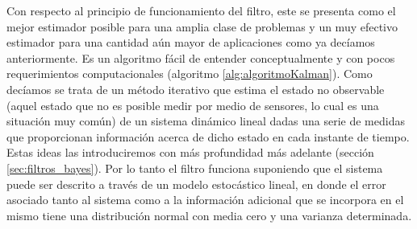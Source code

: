 %
%
%
Con respecto al principio de funcionamiento del filtro, este se presenta como el mejor estimador posible para una amplia clase de problemas y un muy efectivo estimador para una cantidad aún mayor de aplicaciones como ya decíamos anteriormente. 
%
%
%
%
%
Es un algoritmo fácil de entender conceptualmente y con pocos requerimientos computacionales (algoritmo \ref{alg:algoritmoKalman}). 
%
%
%
%
%
%
Como decíamos se trata de un método iterativo que estima el estado no observable (aquel estado que no es posible medir por medio de sensores, lo cual es una situación muy común) de un sistema dinámico lineal dadas una serie de medidas que proporcionan información acerca de dicho estado en cada instante de tiempo.
%
%
Estas ideas las introduciremos con más profundidad más adelante (sección \ref{sec:filtros_bayes}).
%
%
%
%
%
Por lo tanto el filtro funciona suponiendo que el sistema puede ser descrito a través de un modelo estocástico lineal, en donde el error asociado tanto al sistema como a la información adicional que se incorpora en el mismo tiene una distribución normal con media cero y una varianza determinada. 
